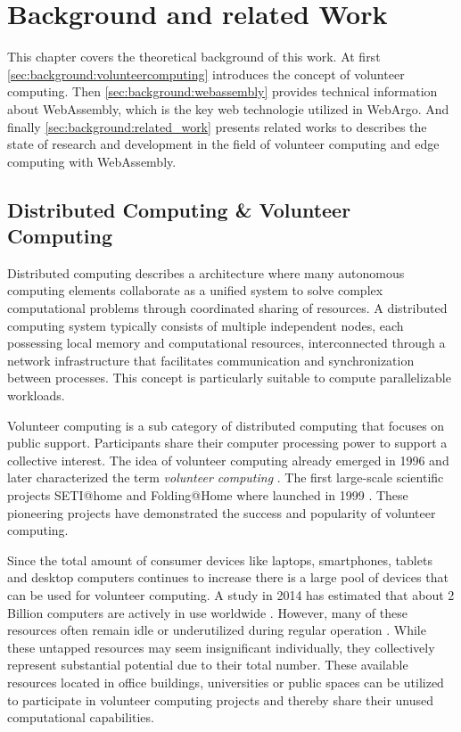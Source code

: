 \chapter{Background and related Work}
\label{ch:background}
This chapter covers the theoretical background of this work. At first \autoref{sec:background:volunteercomputing} introduces the concept of volunteer computing. Then \autoref{sec:background:webassembly} provides technical information about WebAssembly, which is the key web technologie utilized in WebArgo. And finally \autoref{sec:background:related_work} presents related works to describes the state of research and development in the field of volunteer computing and edge computing with WebAssembly.

\section{Distributed Computing \& Volunteer Computing}
\label{sec:background:volunteercomputing}
Distributed computing describes a architecture where many autonomous computing elements collaborate as a unified system to solve complex computational problems through coordinated sharing of resources. A distributed computing system typically consists of multiple independent nodes, each possessing local memory and computational resources, interconnected through a network infrastructure that facilitates communication and synchronization between processes. This concept is particularly suitable to compute parallelizable workloads.

Volunteer computing is a sub category of distributed computing that focuses on public support. Participants share their computer processing power to support a collective interest. The idea of volunteer computing already emerged in 1996 \cite{relatedwork:boinc1} and \citeauthor{background:vcname} later characterized the term \emph{volunteer computing} \cite{background:vcname}. The first large-scale scientific projects SETI@home and Folding@Home where launched in 1999 \cite{relatedwork:boinc1,relatedwork:seti}. These pioneering projects have demonstrated the success and popularity of volunteer computing.

Since the total amount of consumer devices like laptops, smartphones, tablets and desktop computers continues to increase \cite{background:amountdeviceses,relatedwork:boinc1} there is a large pool of devices that can be used for volunteer computing. A study in 2014 has estimated that about 2 Billion computers are actively in use worldwide \cite{intro:computersAmount}. However, many of these resources often remain idle or underutilized during regular operation \cite{relatedwork:mobilecloud, relatedwork:wasmedgecomputing}. While these untapped resources may seem insignificant individually, they collectively represent substantial potential due to their total number. These available resources located in office buildings, universities or public spaces can be utilized to participate in volunteer computing projects and thereby share their unused computational capabilities.

